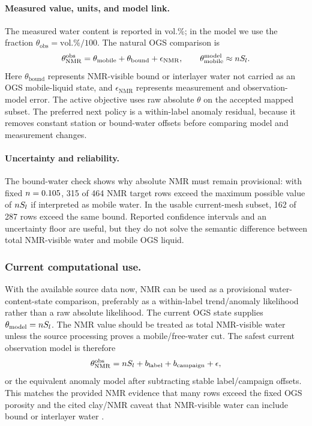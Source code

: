 \paragraph{Measured value, units, and model link.}
The measured water content is reported in vol.\%; in the model we use the fraction
\(\theta_{\mathrm{obs}}=\mathrm{vol.\%}/100\).  The natural OGS comparison is
\[
  \theta_{\mathrm{NMR}}^{\mathrm{obs}}
  =
  \theta_{\mathrm{mobile}}
  +\theta_{\mathrm{bound}}
  +\epsilon_{\mathrm{NMR}},
  \qquad
  \theta_{\mathrm{mobile}}^{\mathrm{model}}
  \approx
  nS_l .
\]
Here \(\theta_{\mathrm{bound}}\) represents NMR-visible bound or interlayer water not
carried as an OGS mobile-liquid state, and \(\epsilon_{\mathrm{NMR}}\) represents
measurement and observation-model error.
The active objective uses raw absolute \(\theta\) on the accepted mapped subset.
The preferred next policy is a within-label anomaly residual, because it removes
constant station or bound-water offsets before comparing model and measurement
changes.

\paragraph{Uncertainty and reliability.}
The bound-water check shows why absolute NMR must remain provisional: with fixed
\(n=0.105\), 315 of 464 NMR target rows exceed the maximum possible value of
\(nS_l\) if interpreted as mobile water.  In the usable current-mesh subset, 162
of 287 rows exceed the same bound.  Reported confidence intervals and an uncertainty
floor are useful, but they do not solve the semantic difference between total
NMR-visible water and mobile OGS liquid.

\subsubsection*{Current computational use.}
With the available source data now, NMR can be used as a provisional
water-content-state comparison, preferably as a within-label trend/anomaly
likelihood rather than a raw absolute likelihood.  The current OGS state supplies
\(\theta_{\mathrm{model}}=nS_l\).  The NMR value should be treated as total
NMR-visible water unless the source processing proves a mobile/free-water cut.
The safest current observation model is therefore
\[
  \theta_{\mathrm{NMR}}^{\mathrm{obs}}
  =
  nS_l
  + b_{\mathrm{label}}
  + b_{\mathrm{campaign}}
  + \epsilon ,
\]
or the equivalent anomaly model after subtracting stable label/campaign offsets.
This matches the provided NMR evidence that many rows exceed the fixed OGS porosity
and the cited clay/NMR caveat that NMR-visible water can include bound or
interlayer water
\citep[Sec.~4.2]{WaterContentEDZ2024}
\citep[Secs.~1 and 2.5]{Cui2022DualScaleNMR}
\citep[NMR source files used for the generated row summaries]{CDAProvidedMeasurementFiles2025}.

